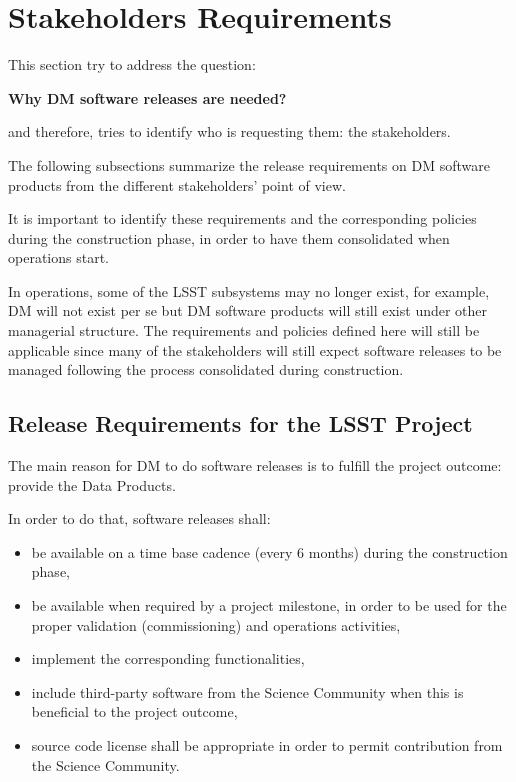 \section{Stakeholders Requirements} \label{sec:reqs}

This section try to address the question: 

\textbf{Why DM software releases are needed?}

and therefore, tries to identify who is requesting them: the stakeholders.

The following subsections summarize the release requirements on \gls{DM} software products from the different stakeholders' point of view.

It is important to identify these requirements and the corresponding policies during the construction phase, in order to have them consolidated when operations start.

In operations, some of the \gls{LSST} subsystems may no longer exist, for example, \gls{DM} will not exist per se but \gls{DM} software products will still exist under other managerial structure.
The requirements and policies defined here will still be applicable since many of the stakeholders will still expect software releases to be managed following the process consolidated during construction.


\subsection{Release Requirements for the \gls{LSST} Project} \label{sec:comreqs}

The main reason for DM to do software releases is to fulfill the project outcome: provide the Data Products.

In order to do that, software releases shall:

\begin{itemize}
\item be available on a time base cadence (every 6 months) during the construction phase,
\item be available when required by a project milestone, in order to be used for the proper validation (commissioning) and operations activities,
\item implement the corresponding functionalities,
\item include third-party software from the Science Community when this is beneficial to the project outcome,
\item source code license shall be appropriate in order to permit contribution from the Science Community.
\end{itemize}


